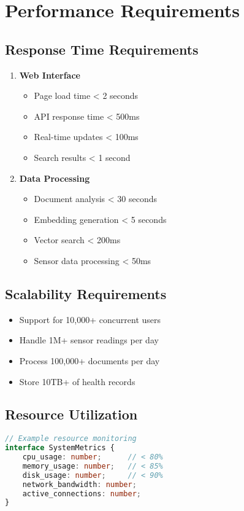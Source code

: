 \section{Performance Requirements}
\subsection{Response Time Requirements}
\begin{enumerate}
    \item \textbf{Web Interface}
    \begin{itemize}
        \item Page load time < 2 seconds
        \item API response time < 500ms
        \item Real-time updates < 100ms
        \item Search results < 1 second
    \end{itemize}

    \item \textbf{Data Processing}
    \begin{itemize}
        \item Document analysis < 30 seconds
        \item Embedding generation < 5 seconds
        \item Vector search < 200ms
        \item Sensor data processing < 50ms
    \end{itemize}
\end{enumerate}

\subsection{Scalability Requirements}
\begin{itemize}
    \item Support for 10,000+ concurrent users
    \item Handle 1M+ sensor readings per day
    \item Process 100,000+ documents per day
    \item Store 10TB+ of health records
\end{itemize}

\subsection{Resource Utilization}
\begin{lstlisting}[language=typescript]
// Example resource monitoring
interface SystemMetrics {
    cpu_usage: number;      // < 80%
    memory_usage: number;   // < 85%
    disk_usage: number;     // < 90%
    network_bandwidth: number;
    active_connections: number;
}
\end{lstlisting} 